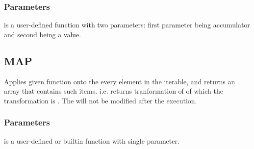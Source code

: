         \subsubsection*{Parameters}
        \begin{itemlist}
        \item {} is a user-defined function with two parameters: first parameter being accumulator and second being a value.
        \end{itemlist}
    \subsection{MAP}
        \par
        Applies given function onto the every element in the iterable, and returns an array that contains such items. i.e. returns tranformation of  of which the transformation is . The  will not be modified after the execution.
        \subsubsection*{Parameters}
        \begin{itemlist}
        \item {} is a user-defined or builtin function with single parameter.
        \end{itemlist}
